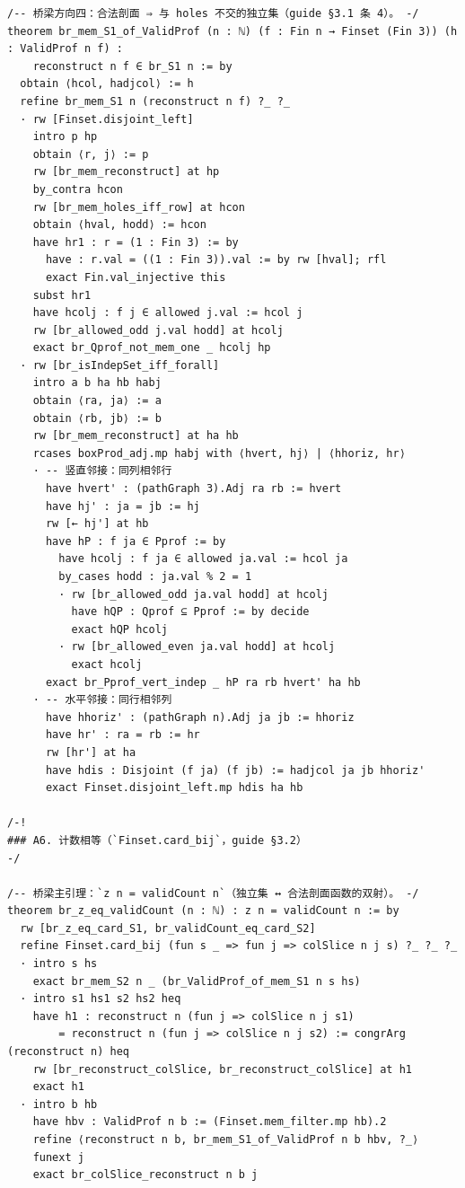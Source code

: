 \documentclass[11pt]{article}
\begin{document}
\begin{lstlisting}
/-- 桥梁方向四：合法剖面 ⇒ 与 holes 不交的独立集（guide §3.1 条 4）。 -/
theorem br_mem_S1_of_ValidProf (n : ℕ) (f : Fin n → Finset (Fin 3)) (h : ValidProf n f) :
    reconstruct n f ∈ br_S1 n := by
  obtain ⟨hcol, hadjcol⟩ := h
  refine br_mem_S1 n (reconstruct n f) ?_ ?_
  · rw [Finset.disjoint_left]
    intro p hp
    obtain ⟨r, j⟩ := p
    rw [br_mem_reconstruct] at hp
    by_contra hcon
    rw [br_mem_holes_iff_row] at hcon
    obtain ⟨hval, hodd⟩ := hcon
    have hr1 : r = (1 : Fin 3) := by
      have : r.val = ((1 : Fin 3)).val := by rw [hval]; rfl
      exact Fin.val_injective this
    subst hr1
    have hcolj : f j ∈ allowed j.val := hcol j
    rw [br_allowed_odd j.val hodd] at hcolj
    exact br_Qprof_not_mem_one _ hcolj hp
  · rw [br_isIndepSet_iff_forall]
    intro a b ha hb habj
    obtain ⟨ra, ja⟩ := a
    obtain ⟨rb, jb⟩ := b
    rw [br_mem_reconstruct] at ha hb
    rcases boxProd_adj.mp habj with ⟨hvert, hj⟩ | ⟨hhoriz, hr⟩
    · -- 竖直邻接：同列相邻行
      have hvert' : (pathGraph 3).Adj ra rb := hvert
      have hj' : ja = jb := hj
      rw [← hj'] at hb
      have hP : f ja ∈ Pprof := by
        have hcolj : f ja ∈ allowed ja.val := hcol ja
        by_cases hodd : ja.val % 2 = 1
        · rw [br_allowed_odd ja.val hodd] at hcolj
          have hQP : Qprof ⊆ Pprof := by decide
          exact hQP hcolj
        · rw [br_allowed_even ja.val hodd] at hcolj
          exact hcolj
      exact br_Pprof_vert_indep _ hP ra rb hvert' ha hb
    · -- 水平邻接：同行相邻列
      have hhoriz' : (pathGraph n).Adj ja jb := hhoriz
      have hr' : ra = rb := hr
      rw [hr'] at ha
      have hdis : Disjoint (f ja) (f jb) := hadjcol ja jb hhoriz'
      exact Finset.disjoint_left.mp hdis ha hb

/-!
### A6. 计数相等（`Finset.card_bij`，guide §3.2）
-/

/-- 桥梁主引理：`z n = validCount n`（独立集 ↔ 合法剖面函数的双射）。 -/
theorem br_z_eq_validCount (n : ℕ) : z n = validCount n := by
  rw [br_z_eq_card_S1, br_validCount_eq_card_S2]
  refine Finset.card_bij (fun s _ => fun j => colSlice n j s) ?_ ?_ ?_
  · intro s hs
    exact br_mem_S2 n _ (br_ValidProf_of_mem_S1 n s hs)
  · intro s1 hs1 s2 hs2 heq
    have h1 : reconstruct n (fun j => colSlice n j s1)
        = reconstruct n (fun j => colSlice n j s2) := congrArg (reconstruct n) heq
    rw [br_reconstruct_colSlice, br_reconstruct_colSlice] at h1
    exact h1
  · intro b hb
    have hbv : ValidProf n b := (Finset.mem_filter.mp hb).2
    refine ⟨reconstruct n b, br_mem_S1_of_ValidProf n b hbv, ?_⟩
    funext j
    exact br_colSlice_reconstruct n b j


\end{lstlisting}
\end{document}
